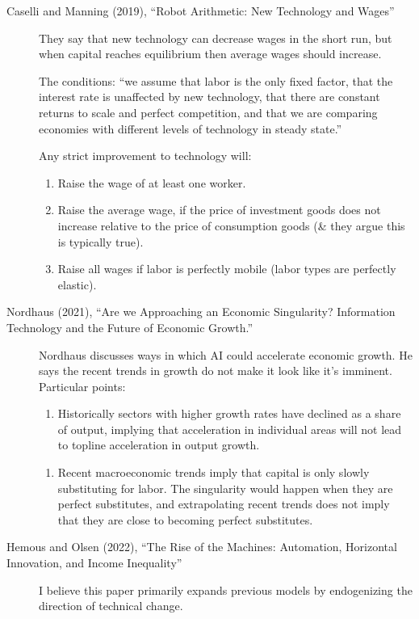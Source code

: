 \documentclass[
  11pt,
  letterpaper,
  DIV=11,
  numbers=noendperiod,
  oneside]{scrartcl}
\providecommand{\tightlist}{%
  \setlength{\itemsep}{0pt}\setlength{\parskip}{0pt}}\usepackage{longtable,booktabs,array}
\begin{document}
\begin{description}
\item[Caselli and Manning (2019), ``Robot Arithmetic: New Technology and
Wages'']
They say that new technology can decrease wages in the short run, but
when capital reaches equilibrium then average wages should increase.

The conditions: ``we assume that labor is the only fixed factor, that
the interest rate is unaffected by new technology, that there are
constant returns to scale and perfect competition, and that we are
comparing economies with different levels of technology in steady
state.''

Any strict improvement to technology will:

\begin{enumerate}
\def\labelenumi{\arabic{enumi}.}
\tightlist
\item
  Raise the wage of at least one worker.
\item
  Raise the average wage, if the price of investment goods does not
  increase relative to the price of consumption goods (\& they argue
  this is typically true).
\item
  Raise all wages if labor is perfectly mobile (labor types are
  perfectly elastic).
\end{enumerate}
\item[Nordhaus (2021), ``Are we Approaching an Economic Singularity?
Information Technology and the Future of Economic Growth.'']
Nordhaus discusses ways in which AI could accelerate economic growth. He
says the recent trends in growth do not make it look like it's imminent.
Particular points:

\begin{enumerate}
\def\labelenumi{(\arabic{enumi})}
\tightlist
\item
  Historically sectors with higher growth rates have declined as a share
  of output, implying that acceleration in individual areas will not
  lead to topline acceleration in output growth.
\end{enumerate}

\begin{enumerate}
\def\labelenumi{(\arabic{enumi})}
\setcounter{enumi}{1}
\tightlist
\item
  Recent macroeconomic trends imply that capital is only slowly
  substituting for labor. The singularity would happen when they are
  perfect substitutes, and extrapolating recent trends does not imply
  that they are close to becoming perfect substitutes.
\end{enumerate}
\item[Hemous and Olsen (2022), ``The Rise of the Machines: Automation,
Horizontal Innovation, and Income Inequality'']
I believe this paper primarily expands previous models by endogenizing
the direction of technical change.


\end{description}
\end{document}
